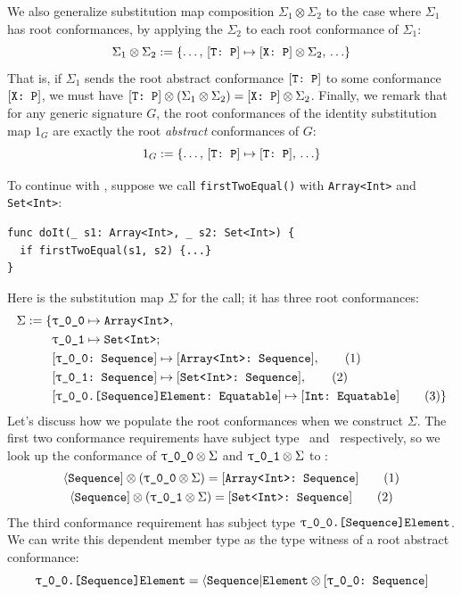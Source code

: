 \documentclass[../generics]{subfiles}
\begin{document}
We also generalize substitution map composition $\Sigma_1 \otimes \Sigma_2$ to the case where $\Sigma_1$ has root conformances, by applying the $\Sigma_2$ to each root conformance of $\Sigma_1$:
\[ \Sigma_1 \otimes \Sigma_2 := \{\ldots,\, [\texttt{T:~P}] \mapsto [\texttt{X:~P}] \otimes \Sigma_2,\, \ldots\} \]
That is, if $\Sigma_1$ sends the root abstract conformance $[\texttt{T:~P}]$ to some conformance $[\texttt{X:~P}]$, we must have $[\texttt{T:~P}]\otimes(\Sigma_1\otimes\Sigma_2) = [\texttt{X:~P}] \otimes \Sigma_2$.
Finally, we remark that for any generic signature $G$, the root conformances of the identity substitution map $1_G$ are exactly the root \emph{abstract} conformances of $G$:
\[ 1_G := \{\ldots,\, [\texttt{T:~P}] \mapsto [\texttt{T:~P}],\, \ldots\} \]

\begin{example}\label{abstract conformance example 2}
To continue with , suppose we call \texttt{firstTwoEqual()} with \texttt{Array<Int>} and \texttt{Set<Int>}:
\begin{Verbatim}
func doIt(_ s1: Array<Int>, _ s2: Set<Int>) {
  if firstTwoEqual(s1, s2) {...}
}
\end{Verbatim}
Here is the substitution map $\Sigma$ for the call; it has three root conformances:
\begin{align*}
\Sigma := \{
&\SubstType{\rT}{Array<Int>},\\
&\SubstType{\rU}{Set<Int>};\\
&\SubstConf{\rT}{Array<Int>}{Sequence},\tag{1}\\
&\SubstConf{\rU}{Set<Int>}{Sequence},\tag{2}\\
&\SubstConf{\rT.[Sequence]Element}{Int}{Equatable}\tag{3}
\}
\end{align*}
Let's discuss how we populate the root conformances when we construct $\Sigma$. The first two conformance requirements have subject type \rT\ and \rU\ respectively, so we look up the conformance of $\rT\otimes\Sigma$ and $\rU\otimes\Sigma$ to \tSequence:
\begin{gather*}
\PSequence \otimes (\rT \otimes \Sigma) = \ConfReq{Array<Int>}{Sequence}\tag{1}\\
\PSequence \otimes (\rU \otimes \Sigma) = \ConfReq{Set<Int>}{Sequence}\tag{2}
\end{gather*}
The third conformance requirement has subject type $\texttt{\rT.[Sequence]Element}$. We can write this dependent member type as the type witness of a root abstract conformance:
\[\texttt{\rT.[Sequence]Element} = \AElement \otimes \rTSequence\]

\end{example}
\end{document}
